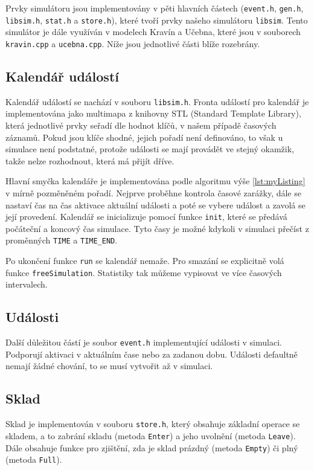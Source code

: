 \documentclass[12pt,a4paper,titlepage,final]{article}
\begin{document}
Prvky simulátoru jsou implementovány v pěti hlavních částech (\texttt{event.h}, \texttt{gen.h}, \texttt{libsim.h}, \texttt{stat.h} a \texttt{store.h}), které tvoří prvky našeho simulátoru \texttt{libsim}. Tento simulátor je dále využíván v modelech Kravín a Učebna, které jsou v souborech \texttt{kravin.cpp} a \texttt{ucebna.cpp}. Níže jsou jednotlivé části blíže rozebrány.
 
\subsection{Kalendář událostí}

Kalendář událostí se nachází v souboru \texttt{libsim.h}. Fronta událostí pro kalendář je implementována jako multimapa z knihovny STL (Standard Template Library), která jednotlivé prvky seřadí dle hodnot klíčů, v našem případě časových záznamů. Pokud jsou klíče shodné, jejich pořadí není definováno, to však u simulace není podstatné, protože události se mají provádět ve stejný okamžik, takže nelze rozhodnout, která má přijít dříve.

Hlavní smyčka kalendáře je implementována podle algoritmu výše \ref{lst:myListing} v mírně pozměněném pořadí. Nejprve proběhne kontrola časové zarážky, dále se nastaví čas na čas aktivace aktuální události a poté se vybere událost a zavolá se její provedení. Kalendář se inicializuje pomocí funkce \texttt{init}, které se předává počáteční a koncový čas simulace. Tyto časy je možné kdykoli v simulaci přečíst z proměnných \texttt{TIME} a \texttt{TIME\_END}.

Po ukončení funkce \texttt{run} se kalendář nemaže. Pro smazání se explicitně volá funkce \texttt{freeSimu\-lation}. Statistiky tak můžeme vypisovat ve více časových intervalech.

\subsection{Události}

Další důležitou částí je soubor \texttt{event.h} implementující události v simulaci. Podporují aktivaci v aktuálním čase nebo za zadanou dobu. Události defaultně nemají žádné chování, to se musí vytvořit až v simulaci. 

\subsection{Sklad}

Sklad je implementován v souboru \texttt{store.h}, který obsahuje základní operace se skladem, a to zabrání skladu (metoda \texttt{Enter}) a jeho uvolnění (metoda \texttt{Leave}). Dále obsahuje funkce pro zjištění, zda je sklad prázdný (metoda \texttt{Empty}) či plný (metoda \texttt{Full}). 
 
\end{document}
